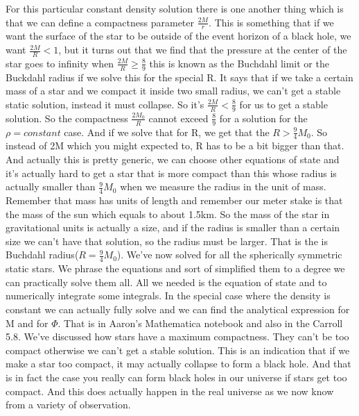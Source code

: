 \documentclass[10pt]{article}
\begin{document}
\newline\newline
For this particular constant density solution there is one another thing which is that we can define a compactness parameter $\frac{2M}{r}$. This is something that if we want the surface of the star to be outside of the event horizon of a black hole, we want $\frac{2M}{R}<1$, but it turns out that we find that the pressure at the center of the star goes to infinity when $\frac{2M}{R}\geq \frac{8}{9}$ this is known as the Buchdahl limit or the Buckdahl radius if we solve this for the special R. It says that if we take a certain mass of a star and we compact it inside two small radius, we can't get a stable static solution, instead it must collapse. So it's $\frac{2M}{R}< \frac{8}{9}$ for us to get a stable solution. So the compactness $\frac{2M_0}{R}$ cannot exceed $\frac{8}{9}$ for a solution for the $\rho=constant$ case. And if we solve that for R, we get that the $R>\frac{9}{4}M_0$. So instead of 2M which you might expected to, R has to be a bit bigger than that. And actually this is pretty generic, we can choose other equations of state and it's actually hard to get a star that is more compact than this whose radius is actually smaller than $\frac{9}{4}M_0$ when we measure the radius in the unit of mass. Remember that mass has units of length and remember our meter stake is that the mass of the sun which equals to about 1.5km. So the mass of the star in gravitational units is actually a size, and if the radius is smaller than a certain size we can't have that solution, so the radius must be larger. That is the is Buchdahl radius($R=\frac{9}{4}M_0$). 
\newline\newline
We've now solved for all the spherically symmetric static stars. We phrase the equations and sort of simplified them to a degree we can practically solve them all. All we needed is the equation of state and to numerically integrate some integrals. In the special case where the density is constant we can actually fully solve and we can find the analytical expression for M and for $\Phi$. That is in Aaron's Mathematica notebook and also in the Carroll 5.8. We've discussed how stars have a maximum compactness. They can't be too compact otherwise we can't get a stable solution. This is an indication that if we make a star too compact, it may actually collapse to form a black hole. And that is in fact the case you really can form black holes in our universe if stars get too compact. And this does actually happen in the real universe as we now know from a variety of observation.



                    					
\end{document}
